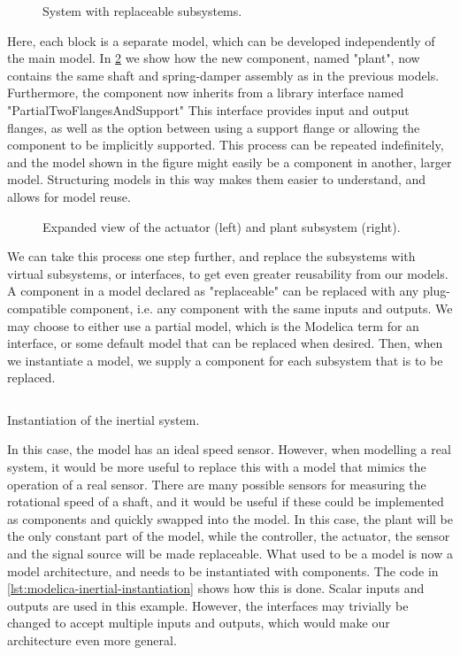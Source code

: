 \documentclass[\rootfolder/main.tex]{subfiles}
\begin{document}
\begin{figure}[ht]
    \caption{System with replaceable subsystems.\label{fig:modelica-inertial-architecture}}
\end{figure}

Here, each block is a separate model, which can be developed independently of the main model.
In \cref{fig:modelica-inertial-architecture-blowup} we show how the new component, named "plant", now contains the same shaft and spring-damper assembly as in the previous models.
Furthermore, the component now inherits from a library interface named "PartialTwoFlangesAndSupport"
This interface provides input and output flanges, as well as the option between using a support flange or allowing the component to be implicitly supported.
This process can be repeated indefinitely, and the model shown in the figure might easily be a component in another, larger model.
Structuring models in this way makes them easier to understand, and allows for model reuse.

\begin{figure}[ht]
    \scriptsize
    \caption{Expanded view of the actuator (left) and plant subsystem (right).\label{fig:modelica-inertial-architecture-blowup}}
\end{figure}

We can take this process one step further, and replace the subsystems with virtual subsystems, or interfaces, to get even greater reusability from our models.
A component in a model declared as "replaceable" can be replaced with any plug-compatible component, i.e. any component with the same inputs and outputs.
We may choose to either use a partial model, which is the Modelica term for an interface, or some default model that can be replaced when desired.
Then, when we instantiate a model, we supply a component for each subsystem that is to be replaced.

\begin{listing}[ht]
    \inputminted{Modelica}{\rootfolder/Models/MasterProject/Models/Inertial.mo}
    \caption{Instantiation of the inertial system.\label{lst:modelica-inertial-instantiation}}
\end{listing}

In this case, the model has an ideal speed sensor. 
However, when modelling a real system, it would be more useful to replace this with a model that mimics the operation of a real sensor.
There are many possible sensors for measuring the rotational speed of a shaft, and it would be useful if these could be implemented as components and quickly swapped into the model.
In this case, the plant will be the only constant part of the model, while the controller, the actuator, the sensor and the signal source will be made replaceable.
What used to be a model is now a model architecture, and needs to be instantiated with components.
The code in \cref{lst:modelica-inertial-instantiation} shows how this is done.
Scalar inputs and outputs are used in this example.
However, the interfaces may trivially be changed to accept multiple inputs and outputs, which would make our architecture even more general.
\end{document}
